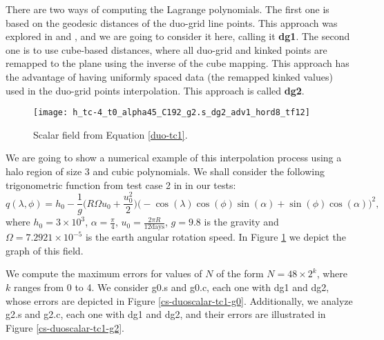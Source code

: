 There are two ways of computing the Lagrange polynomials.
The first one is based on the geodesic distances of the duo-grid line points.
This approach was explored in \citet{chen:2021} and \citet{mouallem:2023}, and we are going to consider it here, calling it \textbf{dg1}.
The second one is to use cube-based distances, where all duo-grid and kinked points are remapped to the plane using the inverse of the cube mapping. 
This approach has the advantage of having uniformly spaced data (the remapped kinked values) used in the duo-grid points interpolation.
This approach is called \textbf{dg2}.
\begin{figure}[!htb]
	\centering
	\texttt{[image: h\_tc-4\_t0\_alpha45\_C192\_g2.s\_dg2\_adv1\_hord8\_tf12]}
	\caption{Scalar field from Equation \eqref{duo-tc1}.\label{cs-duo-tc1}}
\end{figure}

We are going to show a numerical example of this interpolation process using a halo region of size 3 and cubic polynomials.
We shall consider the following trigonometric function
from test case 2 in \citet{will:1992} in our tests:
\begin{equation}
\label{duo-tc1}
q(\lambda, \phi) = h_0 - \frac{1}{g}\bigg(R\Omega u_0 + \frac{u_0^2}{2}\bigg)
\bigg( -\cos(\lambda)\cos(\phi)\sin(\alpha) + \sin(\phi)\cos(\alpha) \bigg)^2,
\end{equation}
where $h_0 = 3\times 10^3 $,
$\alpha=\frac{\pi}{4}$, $u_0 = \frac{2\pi R}{12 \text{days}}$,  $g=9.8$ is the gravity and $\Omega=7.2921 \times 10^{-5}$ is the earth angular rotation speed.
In Figure \ref{cs-duo-tc1} we depict the graph of this field.

We compute the maximum errors for values of $N$ of the form $N=48\times2^k$, where $k$ ranges from 0 to 4. 
We consider g0.s and g0.c, each one with dg1 and dg2, whose errors are depicted in Figure \ref{cs-duoscalar-tc1-g0}.
Additionally, we analyze g2.s and g2.c, each one with dg1 and dg2, and their errors are illustrated in Figure \ref{cs-duoscalar-tc1-g2}.

